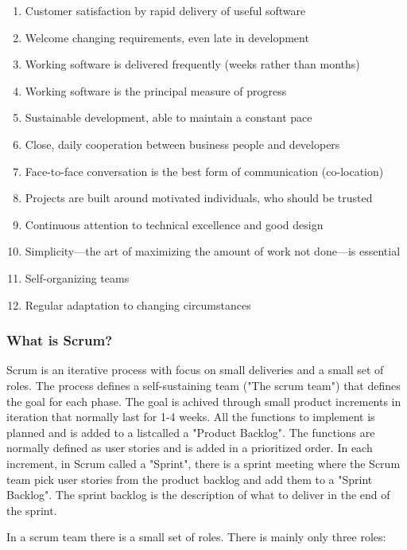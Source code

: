 \begin{enumerate}
    \item Customer satisfaction by rapid delivery of useful software
    \item Welcome changing requirements, even late in development
    \item Working software is delivered frequently (weeks rather than months)
    \item Working software is the principal measure of progress
    \item Sustainable development, able to maintain a constant pace
    \item Close, daily cooperation between business people and developers
    \item Face-to-face conversation is the best form of communication (co-location)
    \item Projects are built around motivated individuals, who should be trusted
    \item Continuous attention to technical excellence and good design
    \item Simplicity—the art of maximizing the amount of work not done—is essential
    \item Self-organizing teams
    \item Regular adaptation to changing circumstances
\end{enumerate}

\subsubsection{What is Scrum?}

Scrum is an iterative process with focus on small deliveries and a small set of roles. 
The process defines a self-sustaining team ("The scrum team") that defines the goal for each phase. The goal 
is achived through small product increments in iteration that normally last for 1-4 weeks. 
All the functions to implement is planned and is added to a listcalled a "Product Backlog". The
functions are normally defined as user stories and is added in a prioritized order. In each increment, 
in Scrum called a "Sprint", there is a sprint meeting where the Scrum team pick user stories from the 
product backlog and add them to a "Sprint Backlog". The sprint backlog is the description of what 
to deliver in the end of the sprint.

In a scrum team there is a small set of roles. There is mainly only three roles: 

